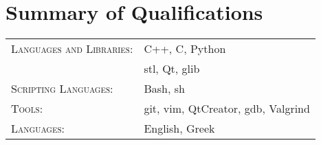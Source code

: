 \documentclass[alan.tex]{subfiles}
\begin{document}
  \section{Summary of Qualifications}
  \begin{tabular}{ll}
    \textsc{Languages and Libraries}:  & C++, C, Python\\
     & stl, Qt, glib\\
    \textsc{Scripting Languages}:  & Bash, sh\\
    \textsc{Tools}: & git, vim, QtCreator, gdb, Valgrind\\
    \textsc{Languages}: & English, Greek
  \end{tabular}
\end{document}
